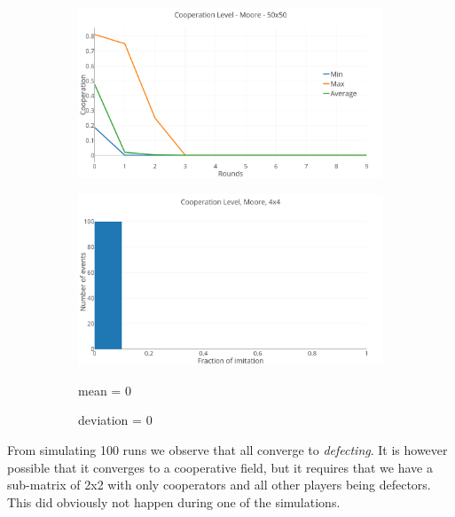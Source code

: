 \documentclass[a4paper, 11pt]{article}
\begin{document}
\begin{figure}[H]
\begin{subfigure}{.75\textwidth}
	\includegraphics[width=1\linewidth]{PDMoore4x4}
\end{subfigure}

\begin{subfigure}{.75\textwidth}
	\includegraphics[width=1\linewidth]{PDMoore4x4HG}
\end{subfigure}%
\begin{subfigure}{.25\textwidth}
	mean = $0$
	
	deviation = $0$
\end{subfigure}

\end{figure}

	From simulating 100 runs we observe that all converge to \textit{defecting}. It is however possible that it converges to a cooperative field, but it requires that we have a sub-matrix of 2x2 with only cooperators and all other players being defectors. This did obviously not happen during one of the simulations.


\newpage
\end{document}
